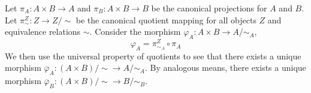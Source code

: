 \documentclass[../../master.tex]{subfiles}
\begin{document}
    \begin{solution}
      Let \(\pi_{A}: A \times B \to A\) and \(\pi_{B}: A \times B \to B\) be the canonical projections for \(A\) and \(B\).
      Let \(\pi_{\sim}^{Z}: Z \to Z / {\sim}\) be the canonical quotient mapping for all objects \(Z\) and equivalence relations \(\sim\).
      Consider the morphism \(\varphi_{A}: A \times B \to A / {\sim_{A}},\)
      \begin{equation*}
        \varphi_{A} = \pi_{\sim_{A}}^{Z} \circ \pi_{A}
      \end{equation*}
      We then use the universal property of quotients to see that there exists a unique morphism
      \(\overline{\varphi}_{A}: (A \times B) / {\sim} \to A / {\sim_{A}}\).
      By analogous means, there exists a unique morphism \(\overline{\varphi}_{B}: (A \times B) / {\sim} \to B / {\sim_{B}}\).


\end{solution}
\end{document}
